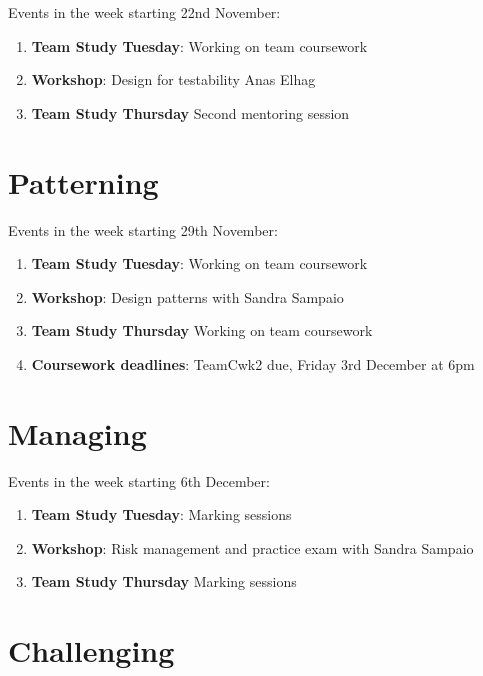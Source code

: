 \documentclass[
]{book}
\providecommand{\tightlist}{%
  \setlength{\itemsep}{0pt}\setlength{\parskip}{0pt}}
\begin{document}
Events in the week starting 22nd November:

\begin{enumerate}
\def\labelenumi{\arabic{enumi}.}
\tightlist
\item
  \textbf{Team Study Tuesday}: Working on team coursework
\item
  \textbf{Workshop}: Design for testability Anas Elhag
\item
  \textbf{Team Study Thursday} Second mentoring session
\end{enumerate}

\hypertarget{week10}{%
\section{Patterning}\label{week10}}

Events in the week starting 29th November:

\begin{enumerate}
\def\labelenumi{\arabic{enumi}.}
\tightlist
\item
  \textbf{Team Study Tuesday}: Working on team coursework
\item
  \textbf{Workshop}: Design patterns with Sandra Sampaio
\item
  \textbf{Team Study Thursday} Working on team coursework
\item
  \textbf{Coursework deadlines}: TeamCwk2 due, Friday 3rd December at 6pm
\end{enumerate}

\hypertarget{week11}{%
\section{Managing}\label{week11}}

Events in the week starting 6th December:

\begin{enumerate}
\def\labelenumi{\arabic{enumi}.}
\tightlist
\item
  \textbf{Team Study Tuesday}: Marking sessions
\item
  \textbf{Workshop}: Risk management and practice exam with Sandra Sampaio
\item
  \textbf{Team Study Thursday} Marking sessions
\end{enumerate}

\hypertarget{week12}{%
\section{Challenging}\label{week12}}
\end{document}
